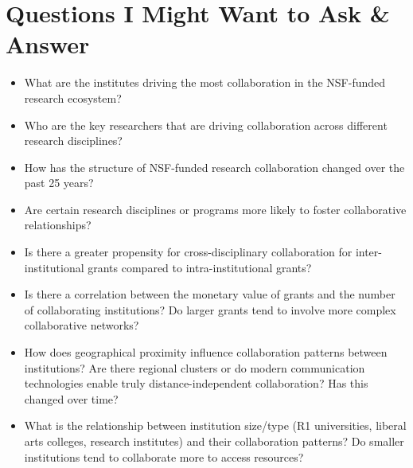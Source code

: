 \documentclass[10pt,twocolumn]{article}
\begin{document}
\section*{Questions I Might Want to Ask \& Answer}
\begin{itemize}
    \item What are the institutes driving the most collaboration in the NSF-funded research ecosystem?
    \item Who are the key researchers that are driving collaboration across different research disciplines?
    \item How has the structure of NSF-funded research collaboration changed over the past 25 years?
    \item Are certain research disciplines or programs more likely to foster collaborative relationships?
    \item Is there a greater propensity for cross-disciplinary collaboration for inter-institutional grants compared to intra-institutional grants?
    \item Is there a correlation between the monetary value of grants and the number of collaborating institutions? Do larger grants tend to involve more complex collaborative networks?
    \item How does geographical proximity influence collaboration patterns between institutions? Are there regional clusters or do modern communication technologies enable truly distance-independent collaboration? Has this changed over time?
    \item What is the relationship between institution size/type (R1 universities, liberal arts colleges, research institutes) and their collaboration patterns? Do smaller institutions tend to collaborate more to access resources?
\end{itemize}
\end{document}
